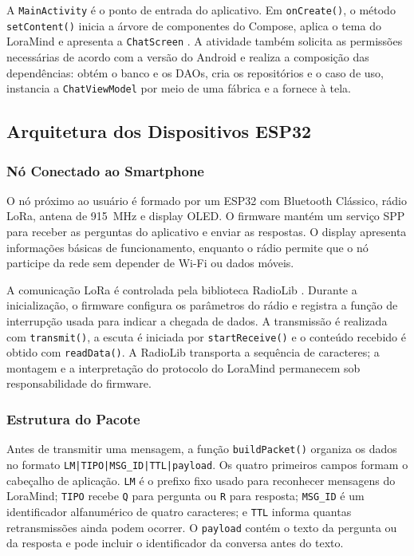 \documentclass[12pt]{article}
\begin{document}
A \texttt{MainActivity} é o ponto de entrada do aplicativo. Em \texttt{onCreate()}, o método \texttt{setContent()} inicia a árvore de componentes do Compose, aplica o tema do LoraMind e apresenta a \texttt{ChatScreen} \cite{androidcomposeviews2026}. A atividade também solicita as permissões necessárias de acordo com a versão do Android e realiza a composição das dependências: obtém o banco e os DAOs, cria os repositórios e o caso de uso, instancia a \texttt{ChatViewModel} por meio de uma fábrica e a fornece à tela.

\subsection{Arquitetura dos Dispositivos ESP32}
\label{subsec:arquitetura-esp32}

\subsubsection{Nó Conectado ao Smartphone}

O nó próximo ao usuário é formado por um ESP32 com Bluetooth Clássico, rádio LoRa, antena de 915~MHz e display OLED. O firmware mantém um serviço SPP para receber as perguntas do aplicativo e enviar as respostas. O display apresenta informações básicas de funcionamento, enquanto o rádio permite que o nó participe da rede sem depender de Wi-Fi ou dados móveis.

A comunicação LoRa é controlada pela biblioteca RadioLib \cite{radiolib2026}. Durante a inicialização, o firmware configura os parâmetros do rádio e registra a função de interrupção usada para indicar a chegada de dados. A transmissão é realizada com \texttt{transmit()}, a escuta é iniciada por \texttt{startReceive()} e o conteúdo recebido é obtido com \texttt{readData()}. A RadioLib transporta a sequência de caracteres; a montagem e a interpretação do protocolo do LoraMind permanecem sob responsabilidade do firmware.

\subsubsection{Estrutura do Pacote}

Antes de transmitir uma mensagem, a função \texttt{buildPacket()} organiza os dados no formato \texttt{LM|TIPO|MSG\_ID|TTL|payload}. Os quatro primeiros campos formam o cabeçalho de aplicação. \texttt{LM} é o prefixo fixo usado para reconhecer mensagens do LoraMind; \texttt{TIPO} recebe \texttt{Q} para pergunta ou \texttt{R} para resposta; \texttt{MSG\_ID} é um identificador alfanumérico de quatro caracteres; e \texttt{TTL} informa quantas retransmissões ainda podem ocorrer. O \texttt{payload} contém o texto da pergunta ou da resposta e pode incluir o identificador da conversa antes do texto.
\end{document}
